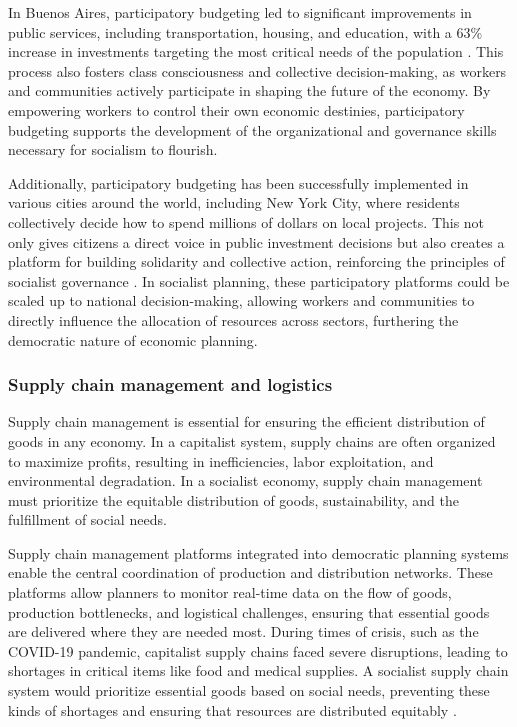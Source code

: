 \begin{refsection}
In Buenos Aires, participatory budgeting led to significant improvements in public services, including transportation, housing, and education, with a 63\% increase in investments targeting the most critical needs of the population \cite[pp.~83]{avritzer2009participation}. This process also fosters class consciousness and collective decision-making, as workers and communities actively participate in shaping the future of the economy. By empowering workers to control their own economic destinies, participatory budgeting supports the development of the organizational and governance skills necessary for socialism to flourish.

Additionally, participatory budgeting has been successfully implemented in various cities around the world, including New York City, where residents collectively decide how to spend millions of dollars on local projects. This not only gives citizens a direct voice in public investment decisions but also creates a platform for building solidarity and collective action, reinforcing the principles of socialist governance \cite[pp.~67]{cabannes2004participatory}. In socialist planning, these participatory platforms could be scaled up to national decision-making, allowing workers and communities to directly influence the allocation of resources across sectors, furthering the democratic nature of economic planning.

\subsubsection{Supply chain management and logistics}

Supply chain management is essential for ensuring the efficient distribution of goods in any economy. In a capitalist system, supply chains are often organized to maximize profits, resulting in inefficiencies, labor exploitation, and environmental degradation. In a socialist economy, supply chain management must prioritize the equitable distribution of goods, sustainability, and the fulfillment of social needs.

Supply chain management platforms integrated into democratic planning systems enable the central coordination of production and distribution networks. These platforms allow planners to monitor real-time data on the flow of goods, production bottlenecks, and logistical challenges, ensuring that essential goods are delivered where they are needed most. During times of crisis, such as the COVID-19 pandemic, capitalist supply chains faced severe disruptions, leading to shortages in critical items like food and medical supplies. A socialist supply chain system would prioritize essential goods based on social needs, preventing these kinds of shortages and ensuring that resources are distributed equitably \cite[pp.~145]{restakis2012humanizing}.


\end{refsection}
